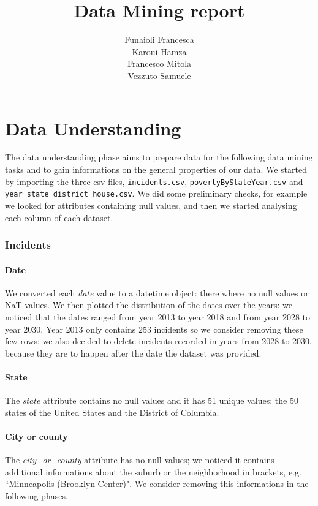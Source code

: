 \documentclass[10pt,a4paper]{report}
\title{\huge{\textbf{Data Mining report}}}
\author{Funaioli Francesca\\
Karoui Hamza\\
Francesco Mitola\\
Vezzuto Samuele}
\begin{document}
\maketitle
\tableofcontents

\chapter{Data Understanding}

The data understanding phase aims to prepare data for the following data mining tasks and to gain informations on the general properties of our data.
We started by importing the three csv files, \texttt{incidents.csv}, \texttt{povertyByStateYear.csv} and \texttt{year\_state\_district\_house.csv}.
We did some preliminary checks, for example we looked for attributes containing null values, and then we started analysing each column of each dataset.

\subsection{Incidents}

\subsubsection{Date}

We converted each \textit{date} value to a datetime object: there where no null values or NaT values.
We then plotted the distribution of the dates over the years: we noticed that the dates ranged from year 2013 to year 2018 and from year 2028 to year 2030.
Year 2013 only contains 253 incidents so we consider removing these few rows; we also decided to delete incidents recorded in years from 2028 to 2030, because they are to happen after the date the dataset was provided.

\subsubsection{State}

The \textit{state} attribute contains no null values and it has 51 unique values: the 50 states of the United States and the District of Columbia.

\subsubsection{City or county}

The \textit{city\_or\_county} attribute has no null values; we noticed it contains additional informations about the suburb or the neighborhood in brackets, e.g. ``Minneapolis (Brooklyn Center)".
We consider removing this informations in the following phases.
\end{document}
